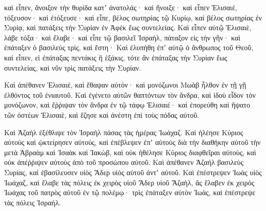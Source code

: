 {καὶ εἶπεν, ἄνοιξον τὴν θυρίδα κατʼ ἀνατολάς· καὶ ἤνοιξε· καὶ εἶπεν Ἑλισαιὲ, τόξευσον· καὶ ἐτόξευσε· καὶ εἶπε, βέλος σωτηρίας τῷ Κυρίῳ, καὶ βέλος σωτηρίας ἐν Συρίᾳ, καὶ πατάξεις τὴν Συρίαν ἐν Ἀφὲκ ἕως συντελείας.
Καὶ εἶπεν αὐτῷ Ἑλισαιὲ, λάβε τόξα· καὶ ἔλαβε· καὶ εἶπε τῷ βασιλεῖ Ἰσραὴλ, πάταξον εἰς τὴν γῆν· καὶ ἐπάταξεν ὁ βασιλεὺς τρὶς, καὶ ἔστη·
Καὶ ἐλυπήθη ἐπʼ αὐτῷ ὁ ἄνθρωπος τοῦ Θεοῦ, καὶ εἶπεν, εἰ ἐπάταξας πεντάκις ἢ ἑξάκις, τότε ἂν ἐπάταξας τὴν Συρίαν ἕως συντελείας, καὶ νῦν τρὶς πατάξεις τὴν Συρίαν.
\par }{\PP {}Καὶ ἀπέθανεν Ἑλισαιὲ, καὶ ἔθαψαν αὐτόν· καὶ μονόζωνοι Μωὰβ ἦλθον ἐν τῇ γῇ ἐλθόντος τοῦ ἐνιαυτοῦ.
Καὶ ἐγένετο αὐτῶν θαπτόντων τὸν ἄνδρα, καὶ ἰδοὺ εἶδον τὸν μονόζωνον, καὶ ἔῤῥιψαν τὸν ἄνδρα ἐν τῷ τάφῳ Ἑλισαιέ· καὶ ἐπορεύθη καὶ ἥψατο τῶν ὀστέων Ἑλισαιὲ, καὶ ἔζησε καὶ ἀνέστη ἐπὶ τοὺς πόδας αὐτοῦ.
\par }{\PP {}Καὶ Ἀζαὴλ ἐξέθλιψε τὸν Ἰσραὴλ πάσας τὰς ἡμέρας Ἰωάχαζ.
Καὶ ἠλέησε Κύριος αὐτοὺς καὶ ᾠκτείρησεν αὐτούς, καὶ ἐπέβλεψεν ἐπʼ αὐτοὺς διὰ τὴν διαθήκην αὐτοῦ τὴν μετὰ Ἁβραὰμ καὶ Ἰσαὰκ καὶ Ἰακὼβ, καὶ οὐκ ἠθέλησε Κύριος διαφθεῖραι αὐτοὺς, καὶ οὐκ ἀπέῤῥιψεν αὐτοὺς ἀπὸ τοῦ προσώπου αὐτοῦ.
Καὶ ἀπέθανεν Ἀζαὴλ βασιλεὺς Συρίας, καὶ ἐβασίλευσεν υἱὸς Ἄδερ υἱὸς αὐτοῦ ἀντʼ αὐτοῦ.
Καὶ ἐπέστρεψεν Ἰωὰς υἱὸς Ἰωάχαζ, καὶ ἔλαβε τὰς πόλεις ἐκ χειρὸς υἱοῦ Ἄδερ υἱοῦ Ἄζαὴλ, ἃς ἔλαβεν ἐκ χειρὸς Ἰωάχας τοῦ πατρὸς αὐτοῦ ἐν τῷ πολέμῳ· τρὶς ἐπάταξεν αὐτὸν Ἰωὰς, καὶ ἐπέστρεψε τὰς πόλεις Ἰσραήλ.

}
